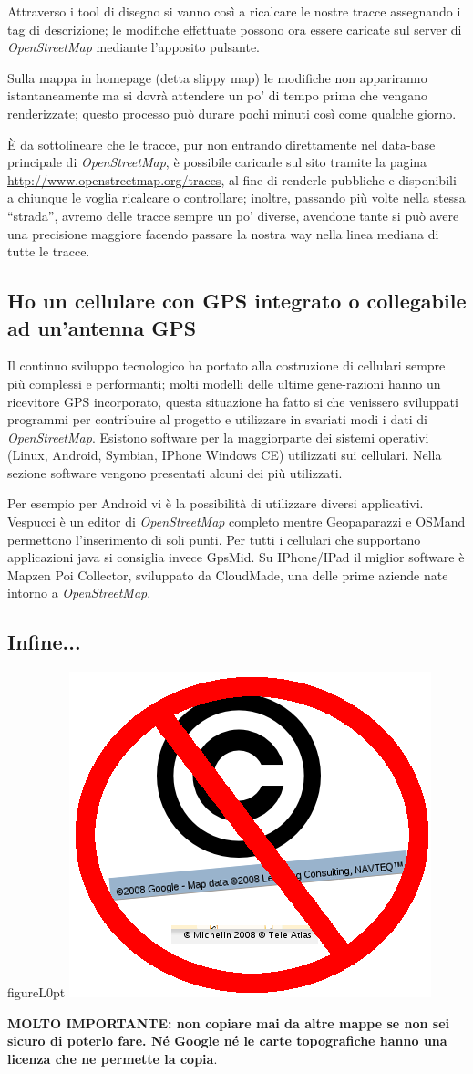 \documentclass[a4paper,twoside,12pt,]{article}
\newcommand{\osm}{\emph{OpenStreetMap}\xspace}
\newcommand{\gps}{GPS\xspace}
\begin{document}
Attraverso i tool di disegno si vanno così a ricalcare le nostre tracce assegnando i tag di descrizione; le modifiche effettuate possono ora essere caricate sul server di \osm mediante l'apposito pulsante.

Sulla mappa in homepage (detta slippy map) le modifiche non appariranno istantaneamente ma si dovrà attendere un po' di tempo prima che vengano renderizzate; questo processo può durare pochi minuti così come qualche giorno.

È da sottolineare che le tracce, pur non entrando direttamente nel data-base principale di \osm, è possibile caricarle sul sito tramite la pagina \url{http://www.openstreetmap.org/traces}, al fine di renderle pubbliche e disponibili a chiunque le voglia ricalcare o controllare; inoltre, passando più volte nella stessa ``strada'', avremo delle tracce sempre un po' diverse, avendone tante si può avere una precisione maggiore facendo passare la nostra way nella linea mediana di tutte le tracce.
\subsection{Ho un cellulare con \gps integrato o collegabile ad un'antenna \gps}
Il continuo sviluppo tecnologico ha portato alla costruzione di cellulari sempre più complessi e performanti; molti modelli delle ultime gene-razioni hanno un ricevitore \gps incorporato, questa situazione ha fatto si che venissero sviluppati programmi per contribuire al progetto e utilizzare in svariati modi i dati di \osm. Esistono software per la maggiorparte dei sistemi operativi (Linux, Android, Symbian, IPhone Windows CE) utilizzati sui cellulari. Nella sezione software vengono presentati alcuni dei più utilizzati.

Per esempio per Android vi è la possibilità di utilizzare diversi applicativi. Vespucci è un editor di \osm completo mentre Geopaparazzi e OSMand permettono l'inserimento di soli punti. \newline
Per tutti i cellulari che supportano applicazioni java si consiglia invece GpsMid.\newline
Su IPhone/IPad il miglior software è Mapzen Poi Collector, sviluppato da CloudMade, una delle prime aziende nate intorno a \osm.


\subsection{Infine...}
\begin{wrapfloat}{figure}{L}{0pt}
 \includegraphics[width=0.2\columnwidth]{noc.png}
\end{wrapfloat}
\textbf{MOLTO IMPORTANTE: non copiare mai da altre mappe se non sei sicuro di poterlo fare. Né Google né le carte topografiche hanno una licenza che ne permette la copia}.
\end{document}
